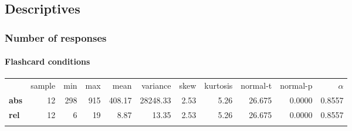 \documentclass[]{article}
\author{}
\date{}
\begin{document}
\subsection{Descriptives}\label{descriptives}

\subsubsection{Number of responses}\label{number-of-responses}

\FloatBarrier
\paragraph{Flashcard conditions}\label{flashcard-conditions}

\begin{longtable}[c]{@{}lrrrrrrrrrr@{}}
\toprule\addlinespace
& sample & min & max & mean & variance & skew & kurtosis & normal-t &
normal-p & $\alpha$
\\\addlinespace
\midrule\endhead
\textbf{abs} & 12 & 298 & 915 & 408.17 & 28248.33 & 2.53 & 5.26 & 26.675
& 0.0000 & 0.8557
\\\addlinespace
\textbf{rel} & 12 & 6 & 19 & 8.87 & 13.35 & 2.53 & 5.26 & 26.675 &
0.0000 & 0.8557
\\\addlinespace
\bottomrule
\end{longtable}
\end{document}
